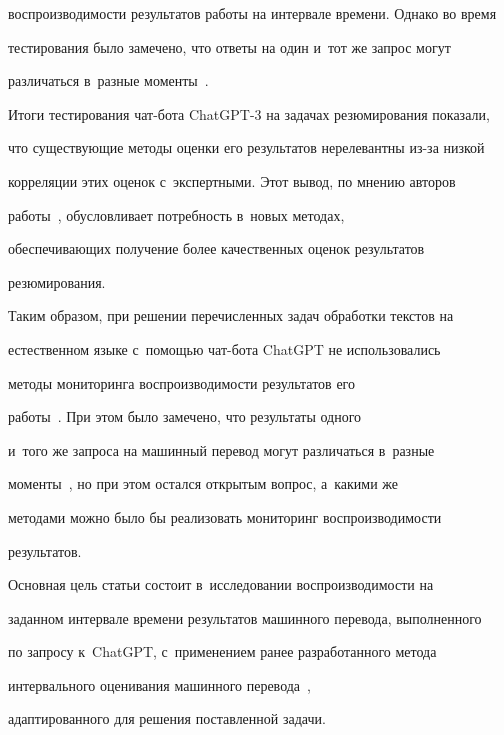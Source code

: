 вос\-про\-из\-во\-ди\-мости результатов работы на интервале времени. Однако во время 


тестирования было замечено, что ответы на один и~тот же за\-прос могут 


различаться в~раз\-ные моменты~\cite{7-eg}.


  


  Итоги тестирования чат-бо\-та ChatGPT-3 на задачах резюмирования показали, 


что су\-щест\-ву\-ющие методы оценки его результатов нерелевантны из-за низ\-кой 


корреляции этих оценок с~экспертными. Этот вывод, по мнению авторов 


работы~\cite{8-eg}, обуслов\-ли\-ва\-ет по\-треб\-ность в~новых методах, 


обес\-пе\-чи\-ва\-ющих получение более качественных оценок результатов 


резюмирования.


  


  Таким образом, при решении перечисленных задач обработки текс\-тов на 


естественном языке с~по\-мощью чат-бота \mbox{ChatGPT} не использовались 


методы мониторинга вос\-про\-из\-во\-ди\-мости результатов его  


работы~\cite{6-eg, 7-eg, 8-eg}. При этом было замечено, что результаты одного 


и~того же за\-про\-са на машинный перевод могут различаться в~разные 


моменты~\cite{7-eg}, но при этом остался открытым вопрос, а~какими же 


методами мож\-но было бы реализовать мониторинг вос\-про\-из\-во\-ди\-мости 


результатов.


  


  Основная цель статьи со\-сто\-ит в~исследовании вос\-про\-из\-во\-ди\-мости на 


заданном интервале времени результатов машинного перевода, выполненного 


по за\-про\-су к~\mbox{ChatGPT}, с~применением ранее разработанного метода 


интервального оценивания машинного перевода~\cite{12-eg, 13-eg}, 


адап\-ти\-ро\-ван\-но\-го для решения по\-став\-лен\-ной за\-дачи.











